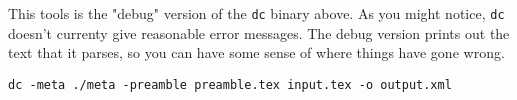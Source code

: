 \begin{gram}[dc.dbg] 
This tools is the "debug" version of the \lstinline`dc` binary above. As you might notice, \lstinline`dc` doesn't currenty give reasonable error messages.  The debug version prints out the text that it parses, so you can have some sense of where things have gone wrong. 

\begin{lstlisting}
dc -meta ./meta -preamble preamble.tex input.tex -o output.xml
\end{lstlisting}
\end{gram}








 
